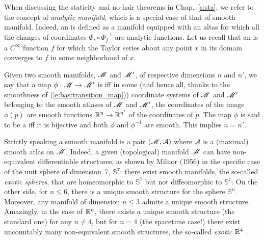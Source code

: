 \begin{remark} \label{r:bas:analytic}
When discussing the staticity and no-hair theorems in Chap.~\ref{s:sta}, we
refer to the concept of
\emph{analytic manifold},
which is a special case of that of smooth manifold. Indeed, an
is defined as a manifold equipped with an altas for which all the changes of coordinates
$\Phi_i \circ \Phi_j^{-1}$ are analytic functions.
Let us recall that an 
is a $C^\infty$ function $f$ for
which the Taylor series about any point $x$ in its domain converges to $f$
in some neighborhood of $x$.
\end{remark}

Given two smooth manifolds, $\mathscr{M}$ and $\mathscr{M}'$, of
respective dimensions $n$ and $n'$, we say that a map
$\phi : \mathscr{M} \rightarrow \mathscr{M}'$ is  iff in some (and hence all, thanks to the smoothness of (\ref{e:bas:transition_map})) coordinate systems
of $\mathscr{M}$ and $\mathscr{M}'$ belonging to the smooth atlases of $\mathscr{M}$ and $\mathscr{M}'$,
the coordinates of the image $\phi(p)$ are smooth functions $\mathbb{R}^n\rightarrow \mathbb{R}^{n'}$ of the coordinates of $p$.
The map $\phi$ is said to be a  iff
it is bijective and both $\phi$ and $\phi^{-1}$ are smooth. This implies $n=n'$.

\begin{remark}
Strictly speaking a smooth manifold is a pair $(\mathscr{M},\mathcal{A})$  where
$\mathcal{A}$ is a (maximal) smooth atlas on $\mathscr{M}$.
Indeed, a given (topological) manifold $\mathscr{M}$
can have non-equivalent differentiable structures, as shown by Milnor (1956) \cite{Milno56}
in the specific case of the unit sphere of dimension~7, $\mathbb{S}^7$: there exist smooth manifolds, the so-called \emph{exotic spheres},
that are homeomorphic to $\mathbb{S}^7$ but not diffeomorphic
to $\mathbb{S}^7$.  On the other side, for $n\leq 6$, there is a unique smooth
structure for the sphere $\mathbb{S}^n$.
Moreover, any manifold of dimension $n\leq 3$ admits a unique smooth structure.
Amazingly, in the case of $\mathbb{R}^n$, there exists a unique smooth structure (the standard one) for any $n\not=4$, but for $n=4$ (the spacetime case!) there exist uncountably many non-equivalent smooth structures, the so-called
\emph{exotic $\mathbb{R}^4$} \cite{Taube87}.
\end{remark}

